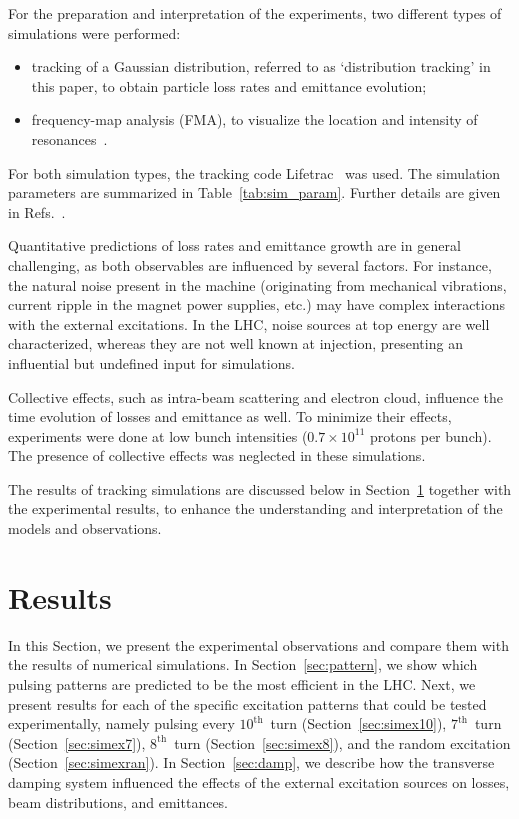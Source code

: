 \documentclass[%
 reprint,
 amsmath,amssymb,
 aps,
prstab,
longbibliography
]{revtex4-1}
\begin{document}
For the preparation and interpretation of the experiments, two
different types of simulations were performed:
%
\begin{itemize}
\item tracking of a Gaussian distribution, referred to as
  `distribution tracking' in this paper, to obtain particle loss rates
  and emittance evolution;
\item frequency-map analysis (FMA), to visualize the location and
  intensity of resonances~\cite{fmalaskar}.
\end{itemize}
%
For both simulation types, the tracking code Lifetrac~\cite{lifetrac}
was used. The simulation parameters are summarized in
Table~\ref{tab:sim_param}. Further details are given in
Refs.~\cite{md_sim_hel_res_ex_fitterer, resexmd2017}.

Quantitative predictions of loss rates and emittance growth are in
general challenging, as both observables are influenced by several
factors. For instance, the natural noise present in the machine
(originating from mechanical vibrations, current ripple in the magnet
power supplies, etc.) may have complex interactions with the external
excitations. In the LHC, noise sources at top energy are well
characterized, whereas they are not well known at injection,
presenting an influential but undefined input for simulations.

Collective effects, such as intra-beam scattering and electron cloud,
influence the time evolution of losses and emittance as well. To
minimize their effects, experiments were done at low bunch intensities
($0.7 \times 10^{11}$ protons per bunch). The presence of collective
effects was neglected in these simulations.

The results of tracking simulations are discussed below in
Section~\ref{sec:simex} together with the experimental results, to
enhance the understanding and interpretation of the models and
observations.



\section{Results}
\label{sec:simex}

In this Section, we present the experimental observations and compare
them with the results of numerical simulations.  In
Section~\ref{sec:pattern}, we show which pulsing patterns are
predicted to be the most efficient in the LHC.  Next, we present
results for each of the specific excitation patterns that could be
tested experimentally, namely pulsing every $10^{\mathrm{th}}$~turn
(Section~\ref{sec:simex10}), $7^{\mathrm{th}}$~turn
(Section~\ref{sec:simex7}), $8^{\mathrm{th}}$~turn
(Section~\ref{sec:simex8}), and the random excitation
(Section~\ref{sec:simexran}).  In Section~\ref{sec:damp}, we describe
how the transverse damping system influenced the effects of the
external excitation sources on losses, beam distributions, and
emittances.
\end{document}
